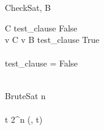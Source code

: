 

\begin{pseudocode}{CheckSat}{\phi, B}

	\FOREACH {} C  \phi \DO
		\BEGIN
			test\_clause \GETS False \\
		
			\FOREACH {} v  C \DO
				\BEGIN
					\IF v \in B 
						\THEN test\_clause \GETS True \\
				\END \\
			\IF test\_clause = False
				\THEN {} \\
		\END \\
\end{pseudocode}

\begin{pseudocode}{BruteSat}{\phi}
	n \phi \\
\\
	\FOR t   2^n \DO
		\BEGIN
			\IF {}(\phi, t) 
				\THEN	{} \\

		\END \\
\end{pseudocode}